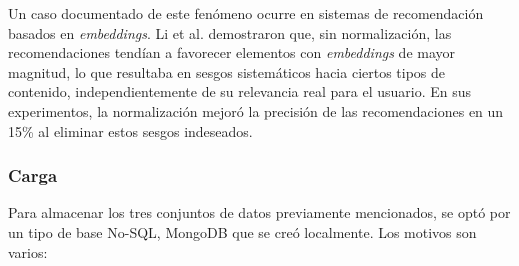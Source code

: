 \documentclass[11pt,a4paper,twoside,openany]{tesis}
\begin{document}
Un caso documentado de este fenómeno ocurre en sistemas de recomendación basados en \emph{embeddings}. Li et al. \cite{li2020improving} demostraron que, sin normalización, las recomendaciones tendían a favorecer elementos con \emph{embeddings} de mayor magnitud, lo que resultaba en sesgos sistemáticos hacia ciertos tipos de contenido, independientemente de su relevancia real para el usuario. En sus experimentos, la normalización mejoró la precisión de las recomendaciones en un 15\% al eliminar estos sesgos indeseados.

\subsubsection{Carga} \textbf{ }

Para almacenar los tres conjuntos de datos previamente mencionados, se optó por un tipo de base No-SQL, MongoDB que se creó localmente. Los motivos son varios:
\end{document}
